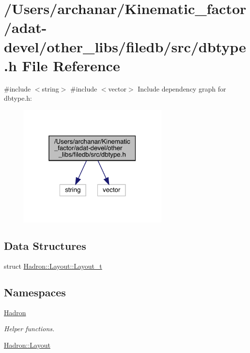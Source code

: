 \hypertarget{adat-devel_2other__libs_2filedb_2src_2dbtype_8h}{}\section{/\+Users/archanar/\+Kinematic\+\_\+factor/adat-\/devel/other\+\_\+libs/filedb/src/dbtype.h File Reference}
\label{adat-devel_2other__libs_2filedb_2src_2dbtype_8h}
{\ttfamily \#include $<$string$>$}\newline
{\ttfamily \#include $<$vector$>$}\newline
Include dependency graph for dbtype.\+h\+:
\nopagebreak
\begin{figure}[H]
\begin{center}
\leavevmode
\includegraphics[width=214pt]{df/daf/adat-devel_2other__libs_2filedb_2src_2dbtype_8h__incl}
\end{center}
\end{figure}
\subsection*{Data Structures}
\begin{DoxyCompactItemize}
\item 
struct \mbox{\hyperlink{structHadron_1_1Layout_1_1Layout__t}{Hadron\+::\+Layout\+::\+Layout\+\_\+t}}
\end{DoxyCompactItemize}
\subsection*{Namespaces}
\begin{DoxyCompactItemize}
\item 
 \mbox{\hyperlink{namespaceHadron}{Hadron}}
\begin{DoxyCompactList}\small\item\em Helper functions. \end{DoxyCompactList}\item 
 \mbox{\hyperlink{namespaceHadron_1_1Layout}{Hadron\+::\+Layout}}
\end{DoxyCompactItemize}
